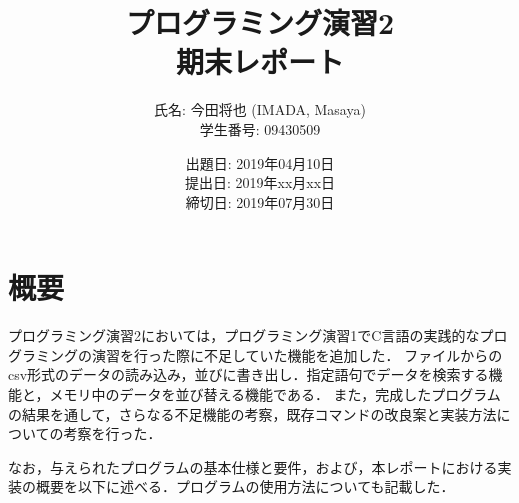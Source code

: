 \documentclass[a4j,11pt]{jarticle}
\title{プログラミング演習2 \\
       期末レポート}
\author{氏名: 今田将也 (IMADA, Masaya) \\
        学生番号: 09430509}
\date{出題日: 2019年04月10日 \\
      提出日: 2019年xx月xx日 \\
      締切日: 2019年07月30日 \\}  %
\begin{document}
\maketitle


\section{概要}\label{sec:gaiyou}

プログラミング演習2においては，プログラミング演習1でC言語の実践的なプログラミングの演習を行った際に不足していた機能を追加した．
ファイルからのcsv形式のデータの読み込み，並びに書き出し．指定語句でデータを検索する機能と，メモリ中のデータを並び替える機能である．
また，完成したプログラムの結果を通して，さらなる不足機能の考察，既存コマンドの改良案と実装方法についての考察を行った．


なお，与えられたプログラムの基本仕様と要件，および，本レポートにおける実装の概要を以下に述べる．プログラムの使用方法についても記載した．
\end{document}
